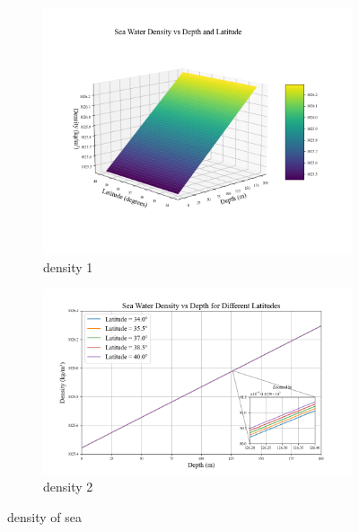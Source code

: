 \begin{figure}[htbp]
  \centering
  \begin{subfigure}[b]{0.45\textwidth}
    \includegraphics[width=\textwidth]{../figures/Density1.png}
    \caption{density 1}
    \label{fig:density1}
  \end{subfigure}
  \hfill
  \begin{subfigure}[b]{0.45\textwidth}
    \includegraphics[width=\textwidth]{../figures/Density2.png}
    \caption{density 2}
    \label{fig:density2}
  \end{subfigure}
  \caption{density of sea}
  \label{fig:density of sea}
\end{figure}

